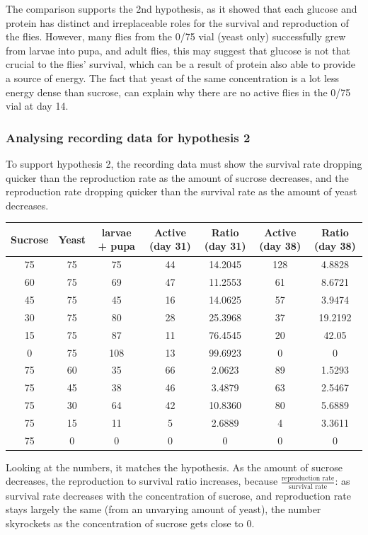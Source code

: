 \documentclass{article}
\begin{document}
\noindent
The comparison supports the 2nd hypothesis, as it showed that each glucose and protein has distinct and irreplaceable roles for the survival and reproduction of the flies. However, many flies from the 0/75 vial (yeast only) successfully grew from larvae into pupa, and adult flies, this may suggest that glucose is not that crucial to the flies' survival, which can be a result of protein also able to provide a source of energy. The fact that yeast of the same concentration is a lot less energy dense than sucrose, can explain why there are no active flies in the 0/75 vial at day 14.

\subsubsection{Analysing recording data for hypothesis 2}

To support hypothesis 2, the recording data must show the survival rate dropping quicker than the reproduction rate as the amount of sucrose decreases, and the reproduction rate dropping quicker than the survival rate as the amount of yeast decreases.

\begin{table}[h]
\centering
\begin{tabular}{|c|c|c|c|c|c|c|}
  \hline
  Sucrose & Yeast & larvae + pupa & Active (day 31) & Ratio (day 31) & Active (day 38) & Ratio (day 38)\\
  \hline
  \hline
  75 & 75 & 75 & 44 & 14.2045 & 128 & 4.8828\\
  \hline
  60 & 75 & 69 & 47 & 11.2553 & 61 & 8.6721\\
  45 & 75 & 45 & 16 & 14.0625 & 57 & 3.9474\\
  30 & 75 & 80 & 28 & 25.3968 & 37 & 19.2192\\
  15 & 75 & 87 & 11 & 76.4545 & 20 & 42.05\\
  0 & 75 & 108 & 13 & 99.6923 & 0 & 0\\
  \hline
  75 & 60 & 35 & 66 & 2.0623 & 89 & 1.5293\\
  75 & 45 & 38 & 46 & 3.4879 & 63 & 2.5467\\
  75 & 30 & 64 & 42 & 10.8360 & 80 & 5.6889\\
  75 & 15 & 11 & 5 & 2.6889 & 4 & 3.3611\\
  75 & 0 & 0 & 0 & 0 & 0 & 0\\
  \hline
\end{tabular}
\end{table}

\noindent
Looking at the numbers, it matches the hypothesis. As the amount of sucrose decreases, the reproduction to survival ratio increases, because $\frac{\text{reproduction rate}}{\text{survival rate}}$: as survival rate decreases with the concentration of sucrose, and reproduction rate stays largely the same (from an unvarying amount of yeast), the number skyrockets as the concentration of sucrose gets close to 0.
\end{document}

